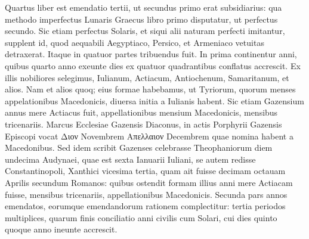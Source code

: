 Quartus liber est emendatio
tertii, ut secundus primo erat subsidiarius: qua methodo imperfectus
Lunaris Graecus libro primo disputatur, ut perfectus secundo.
Sic etiam perfectus Solaris, et siqui alii naturam perfecti imitantur,
supplent id, quod aequabili Aegyptiaco, Persico, et Armeniaco
vetuitas detraxerat.
Itaque in quatuor partes tribuendus fuit.
In
prima continentur anni, quibus quarto anno exeunte dies ex quatuor
quadrantibus conflatus accrescit.
Ex illis nobiliores selegimus,
Iulianum, Actiacum, Antiochenum, Samaritanum, et alios. 
Nam et alios quoq; eius formae habebamus, ut Tyriorum, quorum menses
appelationibus Macedonicis, diuersa initia a Iulianis habent.
Sic
etiam Gazensium annus mere Actiacus fuit, appellationibus mensium 
Macedonicis, mensibus tricenariis. 
Marcus Ecclesiae Gazensis Diaconus,
in actis Porphyrii Gazensis Episcopi vocat \textgreek{Διον} Novembrem
\textgreek{Απελλαιον} Decembrem quae nomina habent a Macedonibus. 
Sed
idem scribit Gazenses celebrasse Theophaniorum diem undecima
Audynaei, quae est sexta Ianuarii Iuliani, se autem redisse Constantinopoli,
Xanthici vicesima tertia, quam ait fuisse decimam octauam
Aprilis secundum Romanos: quibus ostendit formam illius anni mere
Actiacam fuisse, mensibus tricenariis, appellationibus Macedonicis. 
Secunda pars annos emendatos, eorumque emendandorum
rationem complectitur: tertia periodos multiplices, quarum finis
conciliatio anni civilis cum Solari, cui dies quinto quoque anno
ineunte accrescit.


